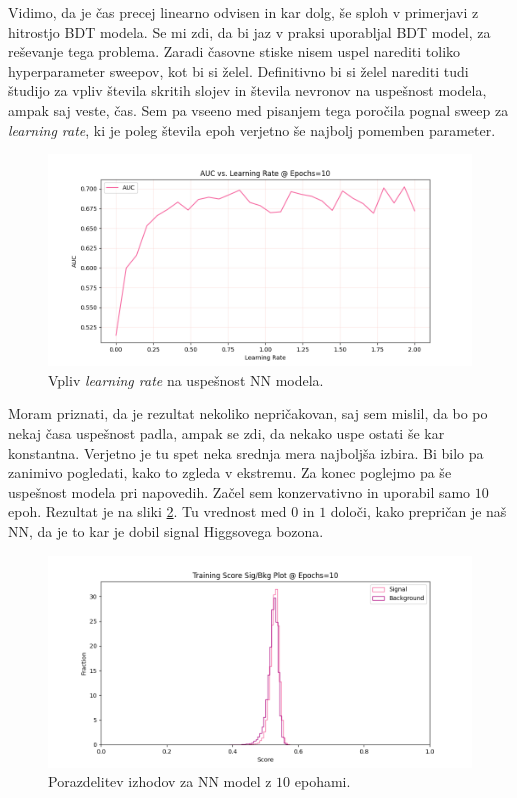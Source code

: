 \documentclass[a4paper]{article}
\begin{document}
Vidimo, da je čas precej linearno odvisen in kar dolg, še sploh v primerjavi z hitrostjo BDT modela. Se mi zdi,
da bi jaz v praksi uporabljal BDT model, za reševanje tega problema. Zaradi časovne stiske nisem uspel narediti
toliko hyperparameter sweepov, kot bi si želel. Definitivno bi si želel narediti tudi študijo za vpliv števila
skritih slojev in števila nevronov na uspešnost modela, ampak saj veste, čas. Sem pa vseeno med pisanjem tega
poročila pognal sweep za \textit{learning rate}, ki je poleg števila epoh verjetno še najbolj pomemben parameter.

\begin{figure}[H]
    \centering
    \includegraphics[width=1\textwidth]{../images/NNlr_sweep.png}
    \caption{Vpliv \textit{learning rate} na uspešnost NN modela.}
    \label{fig:NN_lr}
\end{figure}

Moram priznati, da je rezultat nekoliko nepričakovan, saj sem mislil, da bo po nekaj časa uspešnost padla, ampak
se zdi, da nekako uspe ostati še kar konstantna. Verjetno je tu spet neka srednja mera najboljša izbira. Bi bilo pa zanimivo
pogledati, kako to zgleda v ekstremu. Za konec poglejmo pa še uspešnost modela pri napovedih. Začel sem konzervativno in 
uporabil samo $10$ epoh. Rezultat je na sliki \ref{fig:NN_10}. Tu vrednost med $0$ in $1$ določi, kako prepričan je naš NN, 
da je to kar je dobil signal Higgsovega bozona.

\begin{figure}[H]
    \centering
    \includegraphics[width=1\textwidth]{../images/NNsig_bk_10.png}
    \caption{Porazdelitev izhodov za NN model z $10$ epohami.}
    \label{fig:NN_10}
\end{figure}
\end{document}
